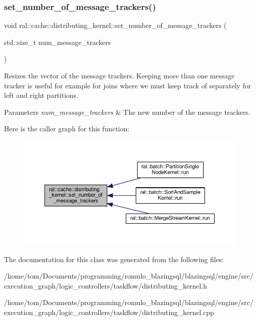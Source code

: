 \subsubsection{\texorpdfstring{set\+\_\+number\+\_\+of\+\_\+message\+\_\+trackers()}{set\_number\_of\_message\_trackers()}}
{\footnotesize\ttfamily void ral\+::cache\+::distributing\+\_\+kernel\+::set\+\_\+number\+\_\+of\+\_\+message\+\_\+trackers (\begin{DoxyParamCaption}\item[{std\+::size\+\_\+t}]{num\+\_\+message\+\_\+trackers }\end{DoxyParamCaption})}



Resizes the vector of the message trackers. Keeping more than one message tracker is useful for example for joins where we must keep track of separately for left and right partitions. 


\begin{DoxyParams}{Parameters}
{\em num\+\_\+message\+\_\+trackers} & The new number of the message trackers. \\
\hline
\end{DoxyParams}
Here is the caller graph for this function\+:\nopagebreak
\begin{figure}[H]
\begin{center}
\leavevmode
\includegraphics[width=350pt]{classral_1_1cache_1_1distributing__kernel_a6466f289452c10450861276054b751da_icgraph}
\end{center}
\end{figure}


The documentation for this class was generated from the following files\+:\begin{DoxyCompactItemize}
\item 
/home/tom/\+Documents/programming/romulo\+\_\+blazingsql/blazingsql/engine/src/execution\+\_\+graph/logic\+\_\+controllers/taskflow/distributing\+\_\+kernel.\+h\item 
/home/tom/\+Documents/programming/romulo\+\_\+blazingsql/blazingsql/engine/src/execution\+\_\+graph/logic\+\_\+controllers/taskflow/distributing\+\_\+kernel.\+cpp\end{DoxyCompactItemize}
